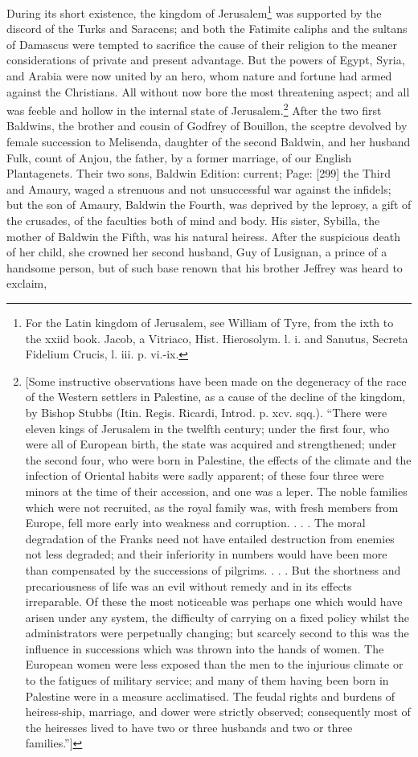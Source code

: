 During its short existence, the kingdom of Jerusalem\footnote{For the Latin kingdom of Jerusalem, see William of Tyre, from the ixth to the xxiid book. Jacob, a Vitriaco, Hist. Hierosolym. l. i. and Sanutus, Secreta Fidelium Crucis, l. iii. p. vi.-ix.} was supported by the discord of the Turks and Saracens; and both the Fatimite caliphs and the sultans of Damascus were tempted to sacrifice the cause of their religion to the meaner considerations of private and present advantage. But the powers of Egypt, Syria, and Arabia were now united by an hero, whom nature and fortune had armed against the Christians. All without now bore the most threatening aspect; and all was feeble and hollow in the internal state of Jerusalem.\footnote{[Some instructive observations have been made on the degeneracy of the race of the Western settlers in Palestine, as a cause of the decline of the kingdom, by Bishop Stubbs (Itin. Regis. Ricardi, Introd. p. xcv. sqq.). \texthebrew{“}There were eleven kings of Jerusalem in the twelfth century; under the first four, who were all of European birth, the state was acquired and strengthened; under the second four, who were born in Palestine, the effects of the climate and the infection of Oriental habits were sadly apparent; of these four three were minors at the time of their accession, and one was a leper. The noble families which were not recruited, as the royal family was, with fresh members from Europe, fell more early into weakness and corruption. . . . The moral degradation of the Franks need not have entailed destruction from enemies not less degraded; and their inferiority in numbers would have been more than compensated by the successions of pilgrims. . . . But the shortness and precariousness of life was an evil without remedy and in its effects irreparable. Of these the most noticeable was perhaps one which would have arisen under any system, the difficulty of carrying on a fixed policy whilst the administrators were perpetually changing; but scarcely second to this was the influence in successions which was thrown into the hands of women. The European women were less exposed than the men to the injurious climate or to the fatigues of military service; and many of them having been born in Palestine were in a measure acclimatised. The feudal rights and burdens of heiress-ship, marriage, and dower were strictly observed; consequently most of the heiresses lived to have two or three husbands and two or three families.\texthebrew{}”]} After the two first Baldwins, the brother and cousin of Godfrey of Bouillon, the sceptre devolved by female succession to Melisenda, daughter of the second Baldwin, and her husband Fulk, count of Anjou, the father, by a former marriage, of our English Plantagenets. Their two sons, Baldwin Edition: current; Page: [299] the Third and Amaury, waged a strenuous and not unsuccessful war against the infidels; but the son of Amaury, Baldwin the Fourth, was deprived by the leprosy, a gift of the crusades, of the faculties both of mind and body. His sister, Sybilla, the mother of Baldwin the Fifth, was his natural heiress. After the suspicious death of her child, she crowned her second husband, Guy of Lusignan, a prince of a handsome person, but of such base renown that his brother Jeffrey was heard to exclaim, 